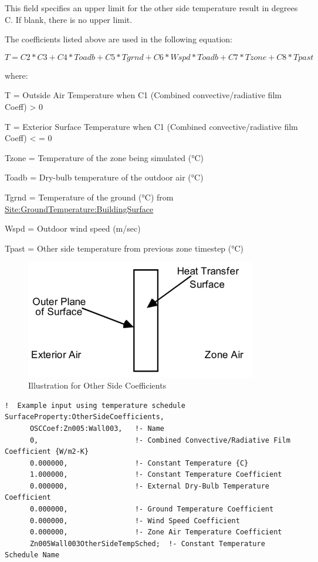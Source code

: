 This field specifies an upper limit for the other side temperature result in degrees C. If blank, there is no upper limit.

The coefficients listed above are used in the following equation:

\begin{equation}
T = C2*C3 + C4*Toadb + C5*Tgrnd + C6*Wspd*Toadb + C7*Tzone + C8*Tpast
\end{equation}

where:

T = Outside Air Temperature when C1 (Combined convective/radiative film Coeff) \textgreater{} 0

T = Exterior Surface Temperature when C1 (Combined convective/radiative film Coeff) \textless{} = 0

Tzone = Temperature of the zone being simulated (°C)

Toadb = Dry-bulb temperature of the outdoor air (°C)

Tgrnd = Temperature of the ground (°C) from \hyperref[sitegroundtemperaturebuildingsurface]{Site:GroundTemperature:BuildingSurface}

Wspd = Outdoor wind speed (m/sec)

Tpast = Other side temperature from previous zone timestep (°C)

\begin{figure}[hbtp] %
\centering
\includegraphics[width=0.9\textwidth, height=0.9\textheight, keepaspectratio=true]{media/image069.png}
\caption{Illustration for Other Side Coefficients \protect \label{fig:illustration-for-other-side-coefficients}}
\end{figure}

\begin{lstlisting}
!  Example input using temperature schedule
SurfaceProperty:OtherSideCoefficients,
      OSCCoef:Zn005:Wall003,   !- Name
      0,                       !- Combined Convective/Radiative Film Coefficient {W/m2-K}
      0.000000,                !- Constant Temperature {C}
      1.000000,                !- Constant Temperature Coefficient
      0.000000,                !- External Dry-Bulb Temperature Coefficient
      0.000000,                !- Ground Temperature Coefficient
      0.000000,                !- Wind Speed Coefficient
      0.000000,                !- Zone Air Temperature Coefficient
      Zn005Wall003OtherSideTempSched;  !- Constant Temperature Schedule Name
\end{lstlisting}

